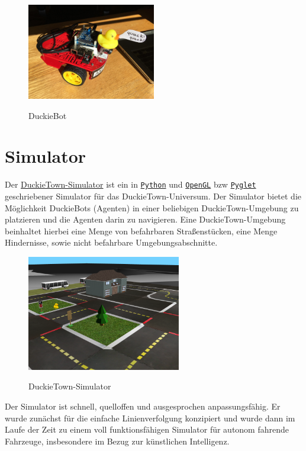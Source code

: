 \begin{figure}[H]
	\centering
	\includegraphics[width=0.5\textwidth]{kapitel2/images/duckiebot.jpg}
	\label{fig:duckiebot}
	\caption{DuckieBot}
\end{figure}


\section{Simulator}

Der \href{https://github.com/duckietown/gym-duckietown}{DuckieTown-Simulator} ist ein in \href{https://www.python.org/}{\texttt{Python}} und \href{https://www.opengl.org/}{\texttt{OpenGL}} \acf{bzw} \href{http://pyglet.org/}{\texttt{Pyglet}} geschriebener Simulator für das \glqq DuckieTown-Universum\grqq. Der Simulator bietet die Möglichkeit DuckieBots (Agenten) in einer beliebigen DuckieTown-Umgebung zu platzieren und die Agenten darin zu navigieren. Eine DuckieTown-Umgebung beinhaltet hierbei eine Menge von befahrbaren Straßenstücken, eine Menge Hindernisse, sowie nicht befahrbare Umgebungsabschnitte. \cite{gym_duckietown} \\

\begin{figure}[H]
	\centering
	\includegraphics[width=0.6\textwidth]{kapitel2/images/duckietown-gym.png}
	\label{fig:duckietown-gym}
	\caption{DuckieTown-Simulator}
\end{figure}

Der Simulator ist schnell, quelloffen und ausgesprochen anpassungsfähig. Er wurde zunächst für die einfache Linienverfolgung konzipiert und wurde dann im Laufe der Zeit zu einem voll funktionsfähigen Simulator für autonom fahrende Fahrzeuge, insbesondere im Bezug zur künstlichen Intelligenz. \cite{gym_duckietown}

